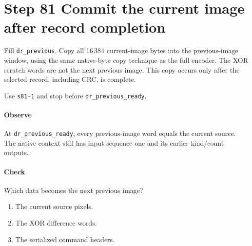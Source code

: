 \section{Step 81 Commit the current image after record completion}
Fill \texttt{dr\_previous}. Copy all 16\,384 current-image bytes into the previous-image window, using the same native-byte copy technique as the full encoder. The XOR scratch words are not the next previous image. This copy occurs only after the selected record, including CRC, is complete.

Use \texttt{s81-1} and stop before \texttt{dr\_previous\_ready}.

\paragraph{Observe} At \texttt{dr\_previous\_ready}, every previous-image word equals the current source. The native context still has input sequence one and its earlier kind/count outputs.

\paragraph{Check} Which data becomes the next previous image?
\begin{enumerate}[label=\Alph*.]
  \item The current source pixels.
  \item The XOR difference words.
  \item The serialized command headers.
\end{enumerate}
